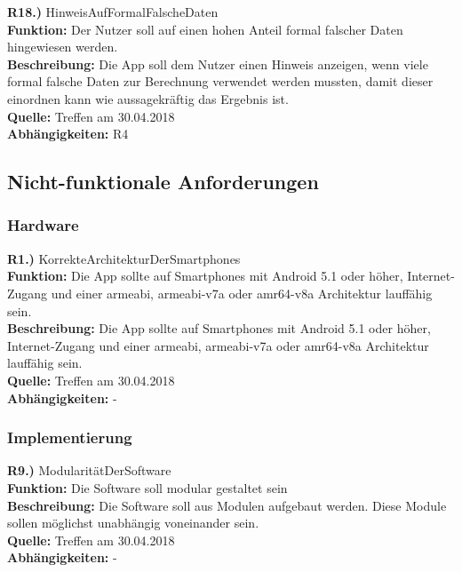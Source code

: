 \documentclass[12pt]{article} %
\begin{document}
\textbf{R18.)} HinweisAufFormalFalscheDaten \\
\textbf{Funktion:} Der Nutzer soll auf einen hohen Anteil formal falscher Daten hingewiesen werden. \\
\textbf{Beschreibung:} Die App soll dem Nutzer einen Hinweis anzeigen, wenn viele formal falsche Daten zur Berechnung verwendet werden mussten, damit dieser einordnen kann wie aussagekräftig das Ergebnis ist. \\
\textbf{Quelle:} Treffen am 30.04.2018 \\
\textbf{Abhängigkeiten:} R4 \\


\subsection{Nicht-funktionale Anforderungen}

\subsubsection{Hardware}

\textbf{R1.)} KorrekteArchitekturDerSmartphones \\
\textbf{Funktion:} Die App sollte auf Smartphones mit Android 5.1 oder höher, Internet-Zugang und einer armeabi, armeabi-v7a oder amr64-v8a Architektur lauffähig sein. \\
\textbf{Beschreibung:} Die App sollte auf Smartphones mit Android 5.1 oder höher, Internet-Zugang und einer armeabi, armeabi-v7a oder amr64-v8a Architektur lauffähig sein. \\
\textbf{Quelle:} Treffen am 30.04.2018 \\
\textbf{Abhängigkeiten:} - \\

\subsubsection{Implementierung}

\textbf{R9.)} ModularitätDerSoftware\\
\textbf{Funktion:} Die Software soll modular gestaltet sein\\
\textbf{Beschreibung:} Die Software soll aus Modulen aufgebaut werden. Diese Module sollen möglichst unabhängig voneinander sein.\\
\textbf{Quelle:} Treffen am 30.04.2018\\
\textbf{Abhängigkeiten:} -\\
\end{document}

